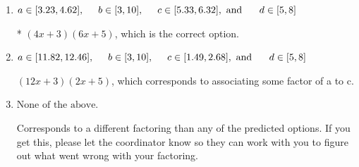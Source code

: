 \documentclass{extbook}[14pt]
\begin{document}
\begin{enumerate}
{\begin{enumerate}[label=\Alph*.]
 $(x + 18)(x + 20)$, which corresponds to factoring $x^{2} +38 x + 360$.
\item \( a \in [3.23, 4.62], \hspace*{5mm} b \in [3, 10], \hspace*{5mm} c \in [5.33, 6.32], \text{ and } \hspace*{5mm} d \in [5, 8] \)

* $(4x + 3)(6x + 5)$, which is the correct option.
\item \( a \in [11.82, 12.46], \hspace*{5mm} b \in [3, 10], \hspace*{5mm} c \in [1.49, 2.68], \text{ and } \hspace*{5mm} d \in [5, 8] \)

 $(12x + 3)(2x + 5)$, which corresponds to associating some factor of a to c.
\item \( \text{None of the above.} \)

 Corresponds to a different factoring than any of the predicted options. If you get this, please let the coordinator know so they can work with you to figure out what went wrong with your factoring.
\end{enumerate}

}
\end{enumerate}
\end{document}
